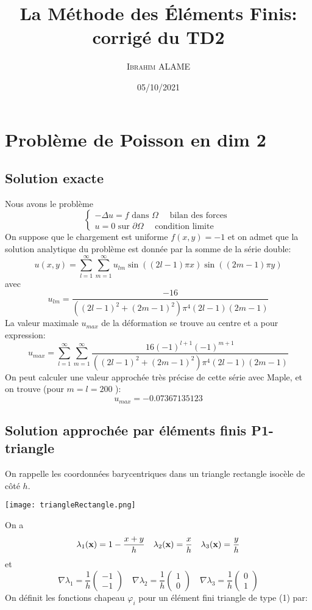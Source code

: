 \documentclass{article}
\title{La Méthode des Éléments Finis: corrigé du TD2}
\author{ \textsc{Ibrahim ALAME}}
\date{05/10/2021}
\begin{document}
  \lstset{
    frame       = single,
    numbers     = left,
    showspaces  = false,
    showstringspaces    = false,
    captionpos  = t,
    caption     = \lstname
}
\maketitle
\section*{Problème de Poisson en dim 2}
\subsection*{Solution exacte}


Nous avons le problème
\begin{equation}
\left\{
\begin{array}{l}
-\Delta u = f \mbox{ dans } \Omega \quad \mbox{ bilan des forces }\\
u=0  \mbox{ sur } \partial \Omega \quad \mbox{ condition limite }
\end{array}
\right.
\label{dirichletDim1}
\end{equation}
On suppose que le chargement est uniforme $f(x,y)=-1$ et on admet que la solution analytique du problème est donnée par la somme de la série double:
\[u(x,y)=\sum_{l=1}^{\infty}\sum_{m=1}^{\infty}u_{lm}\sin\left((2l-1)\pi x\right)\sin\left((2m-1)\pi y\right)\]   
avec  \[u_{lm}=\frac{-16}{((2l-1)^{2}+(2m-1)^{2})\pi^{4}(2l-1)(2m-1)}\]  
La valeur maximale $u_{max}$ de la déformation se trouve au centre et a pour expression:
\[u_{max}=\sum_{l=1}^{\infty}\sum_{m=1}^{\infty}\frac{16(-1)^{l+1}(-1)^{m+1}}{((2l-1)^{2}+(2m-1)^{2})\pi^{4}(2l-1)(2m-1)}\]
On peut calculer une valeur approchée très précise de cette série avec Maple, et on trouve (pour $ m=l=200$ ):
\[u_{max}=-0.07367135123\]

\subsection*{Solution approchée par éléments finis P1-triangle}
On rappelle les coordonnées barycentriques dans un triangle rectangle isocèle de côté $h$.
\begin{center}
\texttt{[image: triangleRectangle.png]}
\end{center}
On a \[\lambda_1(\mbox{\bf x})=1-\frac{x+y}{h}\quad \lambda_2(\mbox{\bf x})=\frac{x}{h}\quad \lambda_3(\mbox{\bf x})=\frac{y}{h}\]
et 
\[\nabla\lambda_1=\frac{1}{h}\left(\begin{array}{c}
-1 \\ -1 \end{array}\right)
\quad 
\nabla\lambda_2=\frac{1}{h}\left(\begin{array}{c}
1 \\ 0 \end{array}\right)
\quad 
\nabla\lambda_3=\frac{1}{h}\left(\begin{array}{c}
0 \\ 1 \end{array}\right)
\]
On définit les fonctions chapeau $\varphi_i$ pour un élément fini triangle de type (1) par:
\end{document}
